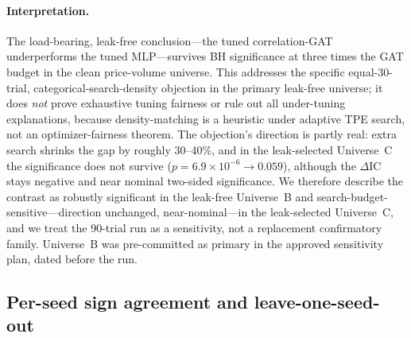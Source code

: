 \documentclass{article}
\begin{document}
\paragraph{Interpretation.}
The load-bearing, leak-free conclusion---the tuned correlation-GAT underperforms
the tuned MLP---survives BH significance at three times the GAT budget in the
clean price-volume universe. This addresses the specific equal-30-trial,
categorical-search-density objection in the primary leak-free universe; it does
\emph{not} prove exhaustive tuning fairness or rule out all under-tuning
explanations, because density-matching is a heuristic under adaptive TPE search,
not an optimizer-fairness theorem. The objection's direction is partly real:
extra search shrinks the gap by roughly 30--40\%, and in the leak-selected
Universe~C the significance does not survive ($p=6.9\times10^{-6}\to0.059$),
although the $\Delta$IC stays negative and near nominal two-sided significance.
We therefore describe the contrast as robustly significant in the leak-free
Universe~B and search-budget-sensitive---direction unchanged,
near-nominal---in the leak-selected Universe~C, and we treat the 90-trial run as
a sensitivity, not a replacement confirmatory family. Universe~B was
pre-committed as primary in the approved sensitivity plan, dated before the run.

\subsection{Per-seed sign agreement and leave-one-seed-out}\label{app:robust:seeds}
\end{document}
